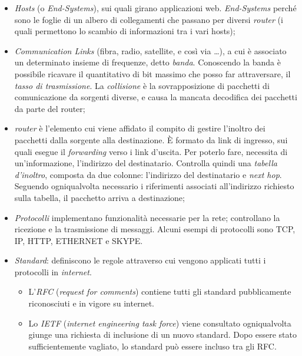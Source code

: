 \begin{itemize}
    \item
        \textit{Hosts} (o \textit{End-Systems}), sui quali girano applicazioni web. \textit{End-Systems} perché sono le foglie di un albero di collegamenti che passano per diversi \textit{router} (i quali permettono lo scambio di informazioni tra i vari hosts);
    \item
        \textit{Communication Links} (fibra, radio, satellite, e così via \ldots), a cui è associato un determinato insieme di frequenze, detto \textit{banda}. Conoscendo la banda è possibile ricavare il quantitativo di bit massimo che posso far attraversare, il \textit{tasso di trasmissione}. La \textit{collisione} è la sovrapposizione di pacchetti di comunicazione da sorgenti diverse, e causa la mancata decodifica dei pacchetti da parte del router;
    \item
        \textit{router} è l'elemento cui viene affidato il compito di gestire l'inoltro dei pacchetti dalla sorgente alla destinazione. È formato da link di ingresso, sui quali esegue il \textit{forwarding} verso i link d'uscita. Per poterlo fare, necessita di un'informazione, l'indirizzo del destinatario. Controlla quindi una \textit{tabella d'inoltro}, composta da due colonne: l'indirizzo del destinatario e \textit{next hop}. Seguendo ogniqualvolta necessario i riferimenti associati all'indirizzo richiesto sulla tabella, il pacchetto arriva a destinazione;
    \item
        \textit{Protocolli} implementano funzionalità necessarie per la rete; controllano la ricezione e la trasmissione di messaggi. Alcuni esempi di protocolli sono TCP, IP, HTTP, ETHERNET e SKYPE.
    \item
        \textit{Standard}: definiscono le regole attraverso cui vengono applicati tutti i protocolli in \textit{internet}.
        \begin{itemize}
            \item L'\textit{RFC} (\textit{request for comments}) contiene tutti gli standard pubblicamente riconosciuti e in vigore su internet.
            \item Lo \textit{IETF} (\textit{internet engineering task force}) viene consultato ogniqualvolta giunge una richiesta di inclusione di un nuovo standard. Dopo essere stato sufficientemente vagliato, lo standard può essere incluso tra gli RFC.
        \end{itemize}
\end{itemize}

